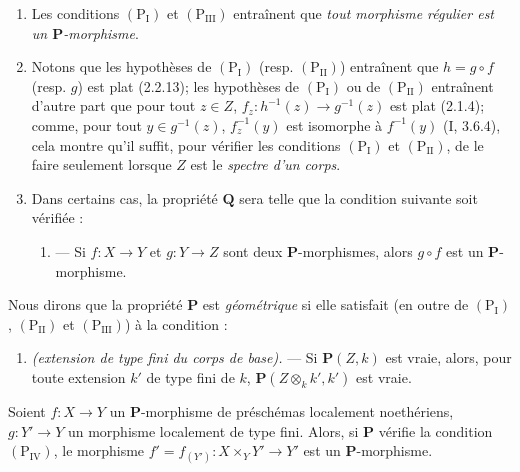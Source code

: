 \begin{remarks}[7.3.5]
\label{IV.2.s7.3.5-fr}
\begin{enumerate}
\item[\emph{i)}] Les conditions $(\mathrm P_{\mathrm I})$ et
$(\mathrm P_{\mathrm{III}})$ entraînent que \emph{tout morphisme régulier
est un $\boldsymbol P$-morphisme}.
\item[\emph{ii)}] Notons que les hypothèses de $(\mathrm P_{\mathrm I})$
(resp. $(\mathrm P_{\mathrm{II}})$) entraînent que $h=g\circ f$ (resp.
$g$) est plat (2.2.13); les hypothèses de $(\mathrm P_{\mathrm I})$ ou de
$(\mathrm P_{\mathrm{II}})$ entraînent d'autre part que pour tout
$z\in Z$, $f_z:h^{-1}(z)\to g^{-1}(z)$ est plat (2.1.4); comme, pour tout
$y\in g^{-1}(z)$, $f_z^{-1}(y)$ est isomorphe à $f^{-1}(y)$ (I, 3.6.4),
cela montre qu'il suffit, pour vérifier les conditions
$(\mathrm P_{\mathrm I})$ et $(\mathrm P_{\mathrm{II}})$, de le faire
seulement lorsque $Z$ est le \emph{spectre d'un corps}.
\item[\emph{iii)}] Dans certains cas, la propriété $\boldsymbol Q$ sera telle que la
condition suivante soit vérifiée :
\begin{enumerate}
\item[$(\mathrm P'_{\mathrm I})$] --- Si $f:X\to Y$ et $g:Y\to Z$ sont
deux $\boldsymbol P$-morphismes, alors $g\circ f$ est un
$\boldsymbol P$-morphisme.
\end{enumerate}
\end{enumerate}
\end{remarks}


\begin{env}[7.3.6]
\label{IV.2.s7.3.6-fr}
Nous dirons que la propriété $\boldsymbol P$ est \emph{géométrique} si elle
satisfait (en outre de $(\mathrm P_{\mathrm I})$,
$(\mathrm P_{\mathrm{II}})$ et $(\mathrm P_{\mathrm{III}})$) à la
condition :
\begin{enumerate}
\item[$(\mathrm P_{\mathrm{IV}})$] \emph{(extension de type fini du corps
de base).} --- Si $\boldsymbol P(Z,k)$ est vraie, alors, pour toute
extension $k'$ de type fini de $k$,
$\boldsymbol P(Z\otimes_k k',k')$ est vraie.
\end{enumerate}
\end{env}

\begin{lemma}[7.3.7]
\label{IV.2.s7.3.7-fr}
Soient $f:X\to Y$ un $\boldsymbol P$-morphisme de préschémas localement
noethériens, $g:Y'\to Y$ un morphisme localement de type fini. Alors, si
$\boldsymbol P$ vérifie la condition $(\mathrm P_{\mathrm{IV}})$, le
morphisme $f'=f_{(Y')}:X\times_Y Y'\to Y'$ est un
$\boldsymbol P$-morphisme.
\end{lemma}

